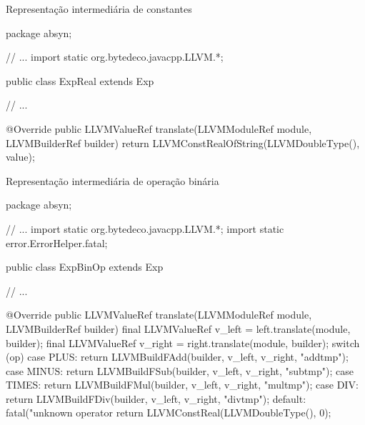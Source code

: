 \documentclass[smaller]{beamer}
\begin{document}
\begin{frame}{Representação intermediária de constantes}
\begin{pygmented}[]
package absyn;

// ...
import static org.bytedeco.javacpp.LLVM.*;

public class ExpReal extends Exp {
   // ...

   @Override
   public LLVMValueRef translate(LLVMModuleRef module,
                                 LLVMBuilderRef builder) {
      return LLVMConstRealOfString(LLVMDoubleType(), value);
   }
}
\end{pygmented}
\end{frame}

\begin{frame}{Representação intermediária de operação binária}
\begin{pygmented}[]
package absyn;

// ...
import static org.bytedeco.javacpp.LLVM.*;
import static error.ErrorHelper.fatal;

public class ExpBinOp extends Exp {
   // ...

   @Override
   public LLVMValueRef translate(LLVMModuleRef module, LLVMBuilderRef builder) {
      final LLVMValueRef v_left = left.translate(module, builder);
      final LLVMValueRef v_right = right.translate(module, builder);
      switch (op) {
         case PLUS:  return LLVMBuildFAdd(builder, v_left, v_right, "addtmp");
         case MINUS: return LLVMBuildFSub(builder, v_left, v_right, "subtmp");
         case TIMES: return LLVMBuildFMul(builder, v_left, v_right, "multmp");
         case DIV:   return LLVMBuildFDiv(builder, v_left, v_right, "divtmp");
         default:    fatal("unknown operator %
                     return LLVMConstReal(LLVMDoubleType(), 0);
      }
   }
}
\end{pygmented}
\end{frame}
\end{document}
